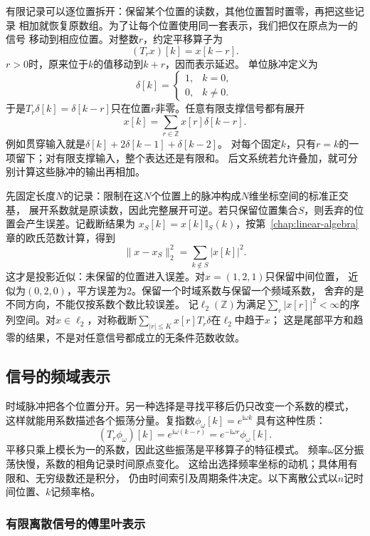 有限记录可以逐位置拆开：保留某个位置的读数，其他位置暂时置零，再把这些记录
相加就恢复原数组。为了让每个位置使用同一套表示，我们把仅在原点为一的信号
移动到相应位置。对整数$r$，约定平移算子为
\[
  (T_rx)[k]=x[k-r].
\]
$r>0$时，原来位于$k$的值移动到$k+r$，因而表示延迟。
单位脉冲定义为
\[
  \delta[k]=
  \begin{cases}
    1,&k=0,\\
    0,&k\neq0.
  \end{cases}
\]
于是$T_r\delta[k]=\delta[k-r]$只在位置$r$非零。任意有限支撑信号都有展开
\begin{equation}
  x[k]=\sum_{r\in\mathbb Z}x[r]\delta[k-r].
  \label{eq:signal-analysis-impulse-expansion}
\end{equation}
例如贯穿输入就是$\delta[k]+2\delta[k-1]+\delta[k-2]$。
对每个固定$k$，只有$r=k$的一项留下；对有限支撑输入，整个表达还是有限和。
后文系统若允许叠加，就可分别计算这些脉冲的输出再相加。

先固定长度$N$的记录：限制在这$N$个位置上的脉冲构成$N$维坐标空间的标准正交基，
展开系数就是原读数，因此完整展开可逆。若只保留位置集合$S$，则丢弃的位置会产生误差。记截断结果为
$x_S[k]=x[k]\mathbb I_S(k)$，按第~\ref{chap:linear-algebra}章的欧氏范数计算，得到
\[
  \|x-x_S\|_2^2=\sum_{k\notin S}|x[k]|^2.
\]
这才是投影近似：未保留的位置进入误差。对$x=(1,2,1)$只保留中间位置，
近似为$(0,2,0)$，平方误差为$2$。保留一个时域系数与保留一个频域系数，
舍弃的是不同方向，不能仅按系数个数比较误差。
记$\ell_2(\mathbb Z)$为满足$\sum_r|x[r]|^2<\infty$的序列空间。对$x\in\ell_2$，对称截断$\sum_{|r|\leq K}x[r]T_r\delta$在$\ell_2$中趋于$x$；
这是尾部平方和趋零的结果，不是对任意信号都成立的无条件范数收敛。

\subsection{信号的频域表示}
\label{sec:signal-analysis-frequency-representation}

时域脉冲把各个位置分开。另一种选择是寻找平移后仍只改变一个系数的模式，
这样就能用系数描述各个振荡分量。复指数$\phi_\omega[k]=e^{\mathrm i\omega k}$
具有这种性质：
\[
  (T_r\phi_\omega)[k]
  =e^{\mathrm i\omega(k-r)}
  =e^{-\mathrm i\omega r}\phi_\omega[k].
\]
平移只乘上模长为一的系数，因此这些振荡是平移算子的特征模式。
频率$\omega$区分振荡快慢，系数的相角记录时间原点变化。
这给出选择频率坐标的动机；具体用有限和、无穷级数还是积分，
仍由时间索引及周期条件决定。以下离散公式以$n$记时间位置、$k$记频率格。

\subsubsection{有限离散信号的傅里叶表示}

